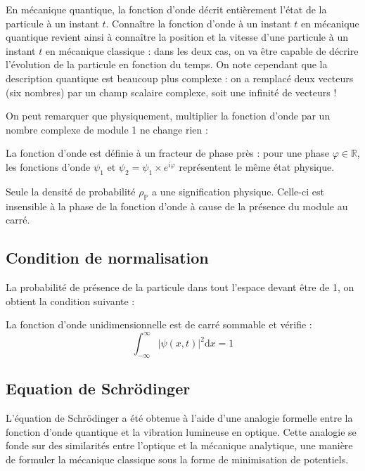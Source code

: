 \documentclass[11pt,fleqn]{book} %
\newcommand{\dd}{\mathrm{d}}
\begin{document}
	En mécanique quantique, la fonction d'onde décrit entièrement l'état de la particule à un instant $t$. Connaître la fonction d'onde à un instant $t$ en mécanique quantique revient ainsi à connaître la position et la vitesse d'une particule à un instant $t$ en mécanique classique : dans les deux cas, on va être capable de décrire l'évolution de la particule en fonction du temps. On note cependant que la description quantique est beaucoup plus complexe : on a remplacé deux vecteurs (six nombres) par un champ scalaire complexe, soit une infinité de vecteurs !

	On peut remarquer que physiquement, multiplier la fonction d'onde par un nombre complexe de module 1 ne change rien :
\begin{proposition}
	La fonction d'onde est définie à un fracteur de phase près : pour une phase $\varphi \in \mathbb{R}$, les fonctions d'onde $\psi_1$ et $\psi_2 = \psi_1 \times e^{i \varphi}$ représentent le même état physique.
\end{proposition}
\begin{demonstration}
	Seule la densité de probabilité $\rho_\mathbb{P}$ a une signification physique. Celle-ci est insensible à la phase de la fonction d'onde à cause de la présence du module au carré.
\end{demonstration}

\subsection{Condition de normalisation}

La probabilité de présence de la particule dans tout l'espace devant être de 1, on obtient la condition suivante :
\begin{proposition}
	La fonction d'onde unidimensionnelle est de carré sommable et vérifie :
	\begin{equation}
	\int_{-\infty}^\infty |\psi(x,t)|^2 \dd x = 1
	\end{equation}
\end{proposition}

\subsection{Equation de Schrödinger}

L'équation de Schrödinger a été obtenue à l'aide d'une analogie formelle entre la fonction d'onde quantique et la vibration lumineuse en optique. Cette analogie se fonde sur des similarités entre l'optique et la mécanique analytique, une manière de formuler la mécanique classique sous la forme de minimisation de potentiels. 
\end{document}
